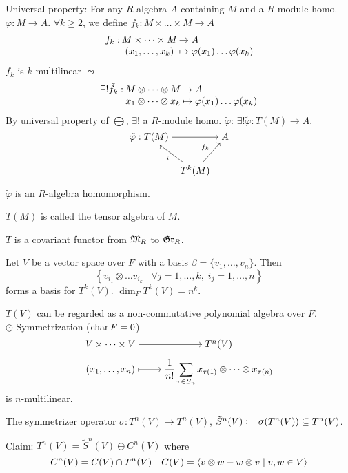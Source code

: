 Universal property:
For any $R$-algebra $A$ containing $M$ and a $R$-module homo.
$\varphi: M \to A$.
$\forall k \ge 2$, we define
$f_k: M \times \dots \times M \to A$
\[
  \arraycolsep=1pt
  \begin{array}{rcl}
    f_k: & M \times \dots \times M & \to A \\
         & (x_1, \dots, x_k) & \mapsto
    \varphi(x_1) \dots \varphi(x_k)
  \end{array}
\]
$f_k$ is $k$-multilinear $\leadsto$
\[
  \arraycolsep=1pt
  \begin{array}{rcl}
    \exists! \tilde{f_k}: & M \otimes \dots \otimes M & \to A \\
         & x_1 \otimes \dots\otimes x_k & \mapsto
    \varphi(x_1) \dots \varphi(x_k)
  \end{array}
\]
By universal property of $\bigoplus$, $\exists!$ a $R$-module homo.
$\tilde\varphi$:
$\exists! \tilde\varphi: T(M) \to A$.
\[
  \begin{tikzcd}[cramped, column sep=tiny]
    \tilde\varphi: T(M) \arrow{rr} & & A \\
      & T^k(M) \arrow{ul}{i} \arrow{ur}{f_k} &
  \end{tikzcd}
\]

$\tilde\varphi$ is an $R$-algebra homomorphism.

\begin{definition}
  $T(M)$ is called the tensor algebra of $M$.
\end{definition}

\begin{exercise}
  $T$ is a covariant functor from $\mathfrak{M}_R$ to $\mathfrak{Gr}_R$.
\end{exercise}

\begin{prop}
  Let $V$ be a vector space over $F$ with a basis $\beta = \{
  v_1, \dots, v_n \}$. Then
  \[
    \left\{
      v_{i_1} \otimes \dots v_{i_k} \middle|
      \forall j = 1, \dots, k,\; i_j = 1, \dots, n
    \right\}
  \]
  forms a basis for $T^k(V)$. $\dim_F T^k(V) = n^k$.
\end{prop}

$T(V)$ can be regarded as a non-commutative polynomial algebra over $F$.
\\[.5em]
$\odot$ Symmetrization ($\operatorname{char} F = 0$)
\[
  \begin{tikzcd}[cramped, row sep=tiny]
    V \times \dots \times V \arrow[r] & T^n(V) \\
    (x_1, \dots, x_n) \arrow[r, mapsto]
    & \displaystyle \frac{1}{n!}\sum_{\tau \in S_n}
    x_{\tau(1)}\otimes \dots \otimes x_{\tau(n)}
  \end{tikzcd}
\]
is $n$-multilinear.

The symmetrizer operator $\sigma: T^n(V) \to T^n(V)$,
$\tilde{S}^n(V) \vcentcolon= \sigma(T^n(V)) \subseteq T^n(V)$.

\underline{Claim}:
$T^n(V) = \tilde{S}^n(V) \oplus C^n(V)$ where
\[ C^n(V) = C(V) \cap T^n(V) \quad
C(V) = \langle v\otimes w - w\otimes v \mid v, w\in V\rangle \]
